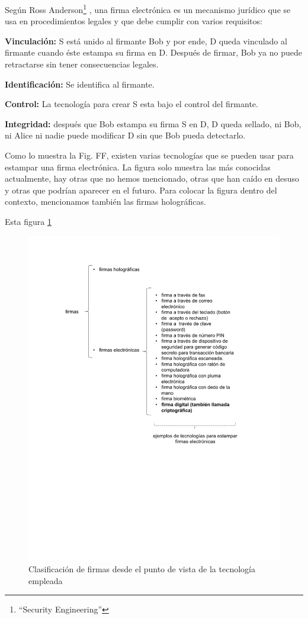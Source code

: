 \documentclass[12pt]{report} %
\begin{document}
\begin{itemize}
Según Ross Anderson\footnote{\cite{Andersson2020}“Security Engineering”} , una firma electrónica es un mecanismo jurídico que se usa en procedimientos legales y que debe cumplir con varios requisitos:

\textbf{Vinculación:} S está unido al firmante Bob y por ende, D queda vinculado al firmante cuando éste estampa su firma en D. Después de firmar, Bob ya no puede retractarse sin tener consecuencias legales.

\textbf{Identificación:} Se identifica al firmante.

\textbf{Control:} La tecnología para crear S esta bajo el control del firmante.

\textbf{Integridad:} después que Bob estampa su firma S en D, D queda sellado, ni Bob, ni Alice ni nadie puede modificar D sin que Bob pueda detectarlo.
 	
Como lo muestra la Fig. FF, existen varias tecnologías que se pueden usar para estampar una firma electrónica. La figura solo muestra las más conocidas actualmente, hay otras que no hemos mencionado, otras que han caído en desuso y otras que podrían aparecer en el futuro. Para colocar la figura dentro del contexto, mencionamos también las firmas holográficas.

Esta figura \ref{Fig. Clases de firmas holografica y electronica}

\begin{figure}
\centering
\includegraphics[width=0.85\columnwidth]{imagenes/clasesfirmashologyelectro.pdf}
\caption{Clasificación de firmas desde el punto de vista de la tecnología empleada}
\label{Fig. Clases de firmas holografica y electronica}
\end{figure} 


\end{itemize}
\end{document}
